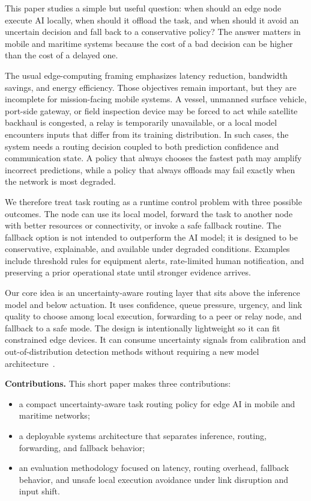 \documentclass[10pt, conference]{IEEEtran}
\begin{document}
This paper studies a simple but useful question: when should an edge node execute AI locally, when should it offload the task, and when should it avoid an uncertain decision and fall back to a conservative policy? The answer matters in mobile and maritime systems because the cost of a bad decision can be higher than the cost of a delayed one.

The usual edge-computing framing emphasizes latency reduction, bandwidth savings, and energy efficiency. Those objectives remain important, but they are incomplete for mission-facing mobile systems. A vessel, unmanned surface vehicle, port-side gateway, or field inspection device may be forced to act while satellite backhaul is congested, a relay is temporarily unavailable, or a local model encounters inputs that differ from its training distribution. In such cases, the system needs a routing decision coupled to both prediction confidence and communication state. A policy that always chooses the fastest path may amplify incorrect predictions, while a policy that always offloads may fail exactly when the network is most degraded.

We therefore treat task routing as a runtime control problem with three possible outcomes. The node can use its local model, forward the task to another node with better resources or connectivity, or invoke a safe fallback routine. The fallback option is not intended to outperform the AI model; it is designed to be conservative, explainable, and available under degraded conditions. Examples include threshold rules for equipment alerts, rate-limited human notification, and preserving a prior operational state until stronger evidence arrives.

Our core idea is an uncertainty-aware routing layer that sits above the inference model and below actuation. It uses confidence, queue pressure, urgency, and link quality to choose among local execution, forwarding to a peer or relay node, and fallback to a safe mode. The design is intentionally lightweight so it can fit constrained edge devices. It can consume uncertainty signals from calibration and out-of-distribution detection methods without requiring a new model architecture~\cite{guo2017calibration,hendrycks2017baseline,zhang2022edgeuncertainty}.

\textbf{Contributions.} This short paper makes three contributions:
\begin{itemize}
    \item a compact uncertainty-aware task routing policy for edge AI in mobile and maritime networks;
    \item a deployable systems architecture that separates inference, routing, forwarding, and fallback behavior;
    \item an evaluation methodology focused on latency, routing overhead, fallback behavior, and unsafe local execution avoidance under link disruption and input shift.
\end{itemize}
\end{document}
